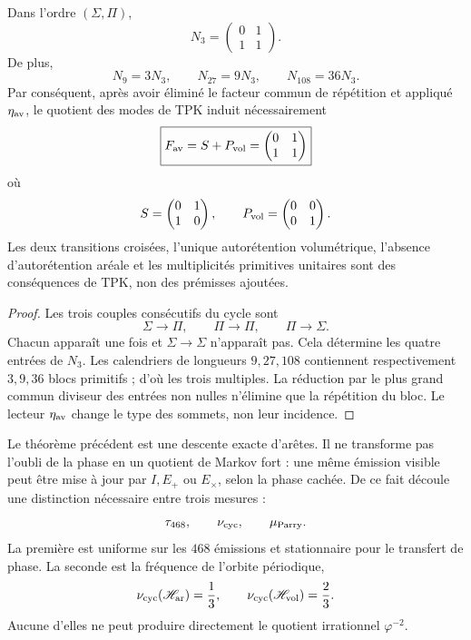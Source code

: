 \begin{theorem}
\label{p12-83-c16-s3:thm:descenso-necesario-fav-corta}
Dans l’ordre \((\Sigma,\Pi)\),
\[
 N_3=
 \begin{pmatrix}0&1\\1&1\end{pmatrix}.
\]
De plus,
\[
 N_9=3N_3,\qquad
 N_{27}=9N_3,\qquad
 N_{108}=36N_3.
\]
Par conséquent, après avoir éliminé le facteur commun de répétition et appliqué
\(\eta_{\rm av}\), le quotient des modes de TPK induit nécessairement
\[
 \boxed{
 F_{\rm av}=S+P_{\rm vol}
 =
 \begin{pmatrix}0&1\\1&1\end{pmatrix}
 }
\]
où
\[
 S=\begin{pmatrix}0&1\\1&0\end{pmatrix},
 \qquad
 P_{\rm vol}=\begin{pmatrix}0&0\\0&1\end{pmatrix}.
\]
Les deux transitions croisées, l'unique autorétention volumétrique,
l'absence d'autorétention aréale et les multiplicités primitives unitaires
sont des conséquences de TPK, non des prémisses ajoutées.
\end{theorem}

\begin{proof}
Les trois couples consécutifs du cycle sont
\[
 \Sigma\longrightarrow\Pi,\qquad
 \Pi\longrightarrow\Pi,\qquad
 \Pi\longrightarrow\Sigma.
\]
Chacun apparaît une fois et \(\Sigma\to\Sigma\) n'apparaît pas. Cela détermine
les quatre entrées de \(N_3\). Les calendriers de longueurs
\(9,27,108\) contiennent respectivement \(3,9,36\) blocs primitifs ;
d'où les trois multiples. La réduction par le plus grand commun diviseur des
entrées non nulles n'élimine que la répétition du bloc. Le lecteur
\(\eta_{\rm av}\) change le type des sommets, non leur incidence.
\end{proof}

Le théorème précédent est une descente exacte d'arêtes. Il ne transforme pas l'oubli
de la phase en un quotient de Markov fort : une même émission visible peut
être mise à jour par \(I,E_+\) ou \(E_\times\), selon la phase cachée. De
ce fait découle une distinction nécessaire entre trois mesures :
\[
 \tau_{468},\qquad
 \nu_{\rm cyc},\qquad
 \mu_{\rm Parry}.
\]
La première est uniforme sur les \(468\) émissions et stationnaire pour le
transfert de phase. La seconde est la fréquence de l'orbite périodique,
\[
 \nu_{\rm cyc}(\mathscr H_{\rm ar})=\frac13,\qquad
 \nu_{\rm cyc}(\mathscr H_{\rm vol})=\frac23.
\]
Aucune d'elles ne peut produire directement le quotient irrationnel
\(\varphi^{-2}\).


